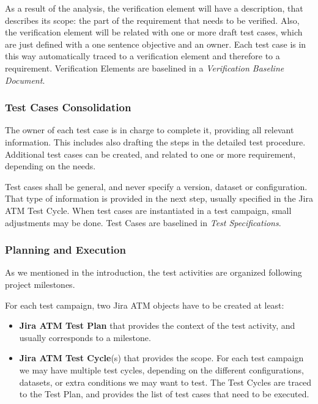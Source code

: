 As a result of the analysis, the verification element will have a description, that describes its scope: the part of the requirement that needs to be verified.
Also, the verification element will be related with one or more draft test cases, which are just defined with a one sentence objective and an owner.
Each test case is in this way automatically traced to a verification element and therefore to a requirement.
Verification Elements are baselined in a \textit{Verification Baseline Document}.

\subsubsection{Test Cases Consolidation}

The owner of each test case is in charge to complete it, providing all relevant information. 
This includes also drafting the steps in the detailed test procedure.
Additional test cases can be created, and related to one or more requirement, depending on the needs.

Test cases shall be general, and never specify a version, dataset or configuration. 
That type of information is provided in the next step, usually specified in the Jira ATM Test Cycle.
When test cases are instantiated in a test campaign, small adjustments may be done.
Test Cases are baselined in \textit{Test Specifications}.

\subsubsection{Planning and Execution}

As we mentioned in the introduction, the test activities are organized following project milestones.

For each test campaign, two Jira ATM objects have to be created at least:

\begin{itemize}
\item \textbf{Jira ATM Test Plan} that provides the context of the test activity, and usually corresponds to a milestone.
\item \textbf{Jira ATM Test Cycle}(s) that provides the scope. For each test campaign we may have multiple test cycles, 
depending on the different configurations, datasets, or extra conditions we may want to test. The Test Cycles are traced
to the Test Plan, and provides the list of test cases that need to be executed.
\end{itemize}

